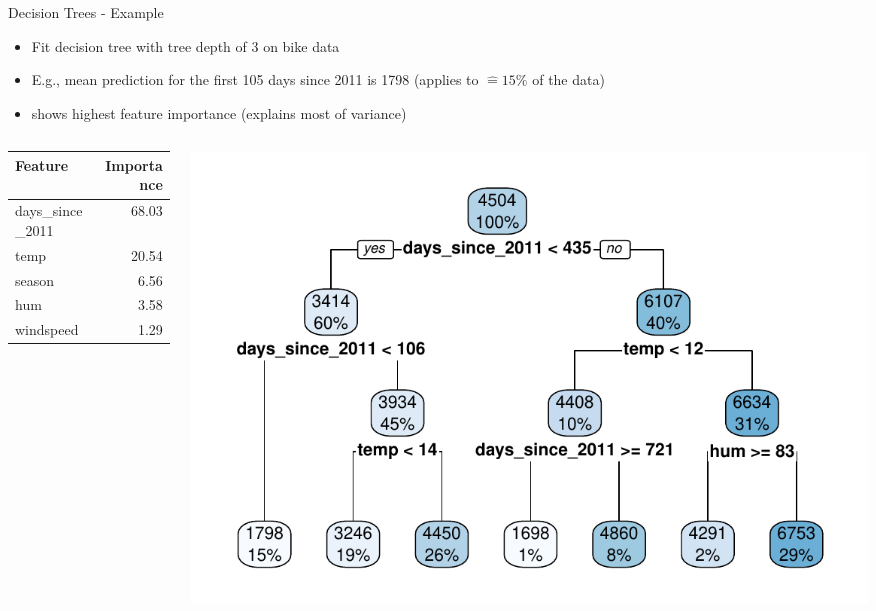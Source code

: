 \documentclass[11pt,compress,t,notes=noshow, aspectratio=169, xcolor=table]{beamer}
\begin{document}
\begin{frame}{Decision Trees - Example}
\begin{itemize}
    \item Fit decision tree with tree depth of 3 on bike data
    \item E.g., mean prediction for the first 105 days since 2011 is 1798 (applies to $\hat = 15\%$ of the data)
    \item {} shows highest feature importance (explains most of variance)
\end{itemize}
\begin{columns}[T]
\begin{column}{0.4\textwidth}
\begin{table}[ht]
\centering
\begin{tabular}{lr}
  \hline
Feature & Importance \\ 
  \hline
days\_since\_2011 & 68.03 \\ 
  temp & 20.54 \\ 
  season & 6.56 \\ 
  hum & 3.58 \\ 
  windspeed & 1.29 \\ 
   \hline
\end{tabular}
\end{table}
\end{column}
\begin{column}{0.6\textwidth}
  \includegraphics[width = \textwidth]{figure/tree.pdf} 
\end{column}
\end{columns}
 
\end{frame}
\end{document}
